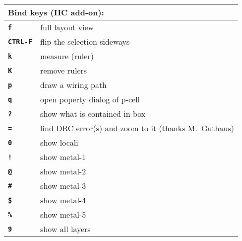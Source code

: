 \documentclass[10pt,a4paper]{article}
\newcommand{\key}[1]{\texttt{\textbf{#1}}}
\begin{document}
        \begin{tabular}{p{}p{}}
                \toprule
		\multicolumn{2}{l}{Bind keys (IIC add-on):}\\
                \midrule
                \key{f} & full layout view\\
                \key{CTRL-F} & flip the selection sideways\\
                \key{k} & measure (ruler)\\
                \key{K} & remove rulers\\
                \key{p} & draw a wiring path\\
                \key{q} & open poperty dialog of p-cell\\
                \key{?} & show what is contained in box\\
                \key{=} & find DRC error(s) and zoom to it (thanks M.~Guthaus)\\
                \key{0} & show locali\\
                \key{!} & show metal-1\\
                \key{@} & show metal-2\\
                \key{\#} & show metal-3\\
                \key{\$} & show metal-4\\
                \key{\%} & show metal-5\\
                \key{9} & show all layers\\
                \bottomrule
        \end{tabular}

	\newpage
\end{document}

